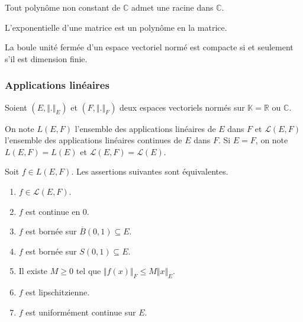 	
	\begin{application}
		Tout polynôme non constant de $\mathbb{C}$ admet une racine dans $\mathbb{C}$.
	\end{application}
	
	
	\begin{application}
		L'exponentielle d'une matrice est un polynôme en la matrice.
	\end{application}
	
	
	\begin{theorem}[Riesz]
		La boule unité fermée d'un espace vectoriel normé est compacte si et seulement s'il est dimension finie.
	\end{theorem}
	
	\subsubsection{Applications linéaires}
	
	
	Soient $(E, \Vert . \Vert_E)$ et $(F, \Vert . \Vert_F)$ deux espaces vectoriels normés sur $\mathbb{K} = \mathbb{R}$ ou $\mathbb{C}$.
	
	\begin{notation}
		On note $L(E,F)$ l'ensemble des applications linéaires de $E$ dans $F$ et $\mathcal{L}(E,F)$ l'ensemble des applications linéaires continues de $E$ dans $F$. Si $E = F$, on note $L(E,F) = L(E)$ et $\mathcal{L}(E,F) = \mathcal{L}(E)$.
	\end{notation}
	
	\begin{theorem}
		Soit $f \in L(E,F)$. Les assertions suivantes sont équivalentes.
		\begin{enumerate}[label=(\roman*)]
			\item $f \in \mathcal{L}(E,F)$.
			\item $f$ est continue en $0$.
			\item $f$ est bornée sur $\overline{B}(0,1) \subseteq E$.
			\item $f$ est bornée sur $S(0,1) \subseteq E$.
			\item Il existe $M \geq 0$ tel que $\Vert f(x) \Vert_F \leq M \Vert x \Vert_E$.
			\item $f$ est lipschitzienne.
			\item $f$ est uniformément continue sur $E$.
		\end{enumerate}
	\end{theorem}
	
